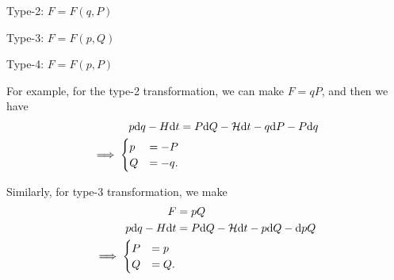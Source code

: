 Type-2: $F=F(q,P)$

Type-3: $F=F(p,Q)$

Type-4: $F=F(p,P)$

For example, for the type-2 transformation, we can make $ F=qP $, and then we have
\begin{align}
p\mathrm{d} q-H\mathrm{d} t &= P \mathrm{d} Q- \mathcal{H} \mathrm{d} t-q\mathrm{d} P -P \mathrm{d} q\\
\implies 
\begin{cases}
p &= -P\\
Q &= -q.
\end{cases}
\end{align}

Similarly, for type-3 transformation, we make 
\begin{align}
F &=pQ\\
p\mathrm{d} q -H\mathrm{d} t &= P\mathrm{d} Q - \mathcal{H} \mathrm{d} t-p\mathrm{d} Q-\mathrm{d} p Q\\
\implies \begin{cases}
P &= p\\
Q &=Q.
\end{cases}
\end{align}




